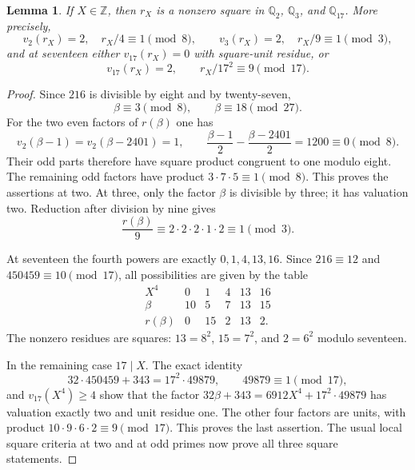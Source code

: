 \documentclass[11pt,a4paper]{article}
\newtheorem{lemma}[theorem]{Lemma}
\theoremstyle{definition}
\theoremstyle{remark}
\begin{document}
\begin{lemma}\label{sn:local-squares}
If $X\in\mathbb Z$, then $r_X$ is a nonzero square in
$\mathbb Q_2$, $\mathbb Q_3$, and $\mathbb Q_{17}$.
More precisely,
\[
 v_2(r_X)=2,\quad r_X/4\equiv1\pmod8,
 \qquad
 v_3(r_X)=2,\quad r_X/9\equiv1\pmod3,
\]
and at seventeen either $v_{17}(r_X)=0$ with square-unit
residue, or
\[
                    v_{17}(r_X)=2,\qquad
                    r_X/17^2\equiv9\pmod{17}.
\]
\end{lemma}
\begin{proof}
Since $216$ is divisible by eight and by twenty-seven,
\[
                    \beta\equiv3\pmod8,
                    \qquad\beta\equiv18\pmod{27}.
\]
For the two even factors of $r(\beta)$ one has
\[
 v_2(\beta-1)=v_2(\beta-2401)=1,
 \qquad
 \frac{\beta-1}{2}-\frac{\beta-2401}{2}=1200\equiv0\pmod8.
\]
Their odd parts therefore have square product congruent to one
modulo eight.  The remaining odd factors have product
$3\cdot7\cdot5\equiv1\pmod8$.  This proves the assertions
at two.  At three, only the factor $\beta$ is divisible by
three; it has valuation two.  Reduction after division by nine
gives
\[
 \frac{r(\beta)}9\equiv
       2\cdot2\cdot2\cdot1\cdot2\equiv1\pmod3.
\]

At seventeen the fourth powers are exactly $0,1,4,13,16$.
Since $216\equiv12$ and $450459\equiv10\pmod{17}$, all
possibilities are given by the table
\[
\begin{array}{c|rrrrr}
 X^4&0&1&4&13&16\\\hline
 \beta&10&5&7&13&15\\
 r(\beta)&0&15&2&13&2.
\end{array}
\]
The nonzero residues are squares: $13=8^2$, $15=7^2$, and
$2=6^2$ modulo seventeen.

In the remaining case $17\mid X$.  The exact identity
\[
 32\cdot450459+343=17^2\cdot49879,
 \qquad 49879\equiv1\pmod{17},
\]
and $v_{17}(X^4)\ge4$ show that the factor
$32\beta+343=6912X^4+17^2\cdot49879$ has valuation exactly
two and unit residue one.  The other four factors are units,
with product
$10\cdot9\cdot6\cdot2\equiv9\pmod{17}$.
This proves the last assertion.  The usual local square criteria
at two and at odd primes now prove all three square statements.
\end{proof}
\end{document}
